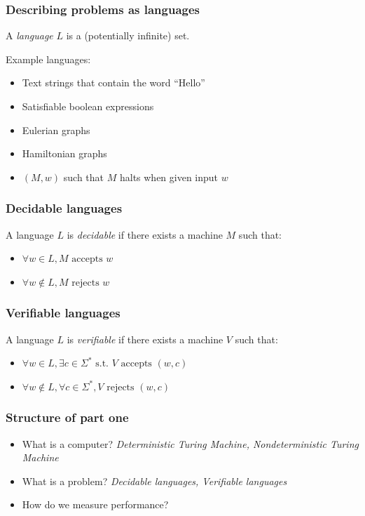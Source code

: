 \documentclass[aspectratio=169]{beamer}
\begin{document}
\begin{frame}
\frametitle{Describing problems as languages}
A {\em language} $L$ is a (potentially infinite) set.

Example languages:
\begin{itemize}
    \item<1-> Text strings that contain the word ``Hello''
    \item<2-> Satisfiable boolean expressions
    \item<3-> Eulerian graphs
    \item<4-> Hamiltonian graphs
    \item<5-> $(M, w)$ such that $M$ halts when given input $w$
\end{itemize}
\end{frame}

\begin{frame}
\frametitle{Decidable languages}
A language $L$ is {\em decidable} if there exists a machine $M$ such that:

\begin{itemize}
    \item $\forall w \in L, M \text{ accepts } w$
    \item $\forall w \notin L, M \text{ rejects } w$
\end{itemize}
\end{frame}

\begin{frame}
\frametitle{Verifiable languages}
A language $L$ is {\em verifiable} if there exists a machine $V$ such that:

\begin{itemize}
    \item $\forall w \in L, \exists c \in \Sigma^* \text{ s.t. } V \text{ accepts } (w,c)$
    \item $\forall w \notin L, \forall c \in \Sigma^*, V \text{ rejects } (w,c)$
\end{itemize}
\end{frame}

\begin{frame}
\frametitle{Structure of part one}
\begin{itemize}
    \item What is a computer? {\em Deterministic Turing Machine, Nondeterministic Turing Machine}
    \item What is a problem? {\em Decidable languages, Verifiable languages}
    \item How do we measure performance?
\end{itemize}
\end{frame}
\end{document}
